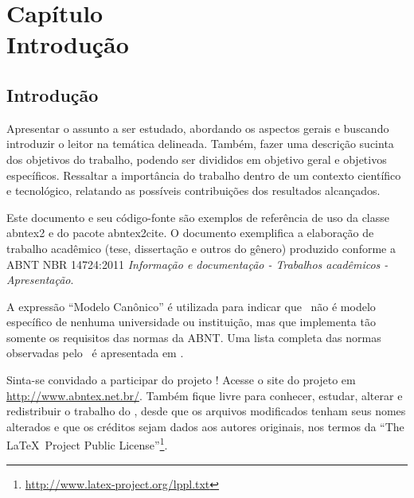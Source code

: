 \documentclass[
	12pt,			%
	openany,			%
	oneside,			%
	a4paper,			%
	english,			%
	french,				%
	spanish,			%
	brazil				%
	]{abntex2}
\let\oldtextual\textual        %
\renewcommand{\textual}{%
	\oldtextual%
	\pagenumbering{arabic} %
}
\begin{document}
\tableofcontents*
\cleardoublepage



\textual
\pagestyle{meuestilo}
\part*{Capítulo \thechapter \\ Introdução}
\addtocounter{chapter}{-1}

\chapter{Introdução}
Apresentar o assunto a ser estudado, abordando os aspectos gerais e buscando
introduzir o leitor na temática delineada. Também, fazer uma descrição sucinta dos
objetivos do trabalho, podendo ser divididos em objetivo geral e objetivos específicos.
Ressaltar a importância do trabalho dentro de um contexto científico e tecnológico,
relatando as possíveis contribuições dos resultados alcançados.

Este documento e seu código-fonte são exemplos de referência de uso da classe
\textsf{abntex2} e do pacote \textsf{abntex2cite}. O documento 
exemplifica a elaboração de trabalho acadêmico (tese, dissertação e outros do
gênero) produzido conforme a ABNT NBR 14724:2011 \emph{Informação e documentação
- Trabalhos acadêmicos - Apresentação}.

A expressão ``Modelo Canônico'' é utilizada para indicar que \abnTeX\ não é
modelo específico de nenhuma universidade ou instituição, mas que implementa tão
somente os requisitos das normas da ABNT. Uma lista completa das normas
observadas pelo \abnTeX\ é apresentada em .

Sinta-se convidado a participar do projeto \abnTeX! Acesse o site do projeto em
\url{http://www.abntex.net.br/}. Também fique livre para conhecer,
estudar, alterar e redistribuir o trabalho do \abnTeX, desde que os arquivos
modificados tenham seus nomes alterados e que os créditos sejam dados aos
autores originais, nos termos da ``The \LaTeX\ Project Public
License''\footnote{\url{http://www.latex-project.org/lppl.txt}}.
\end{document}
